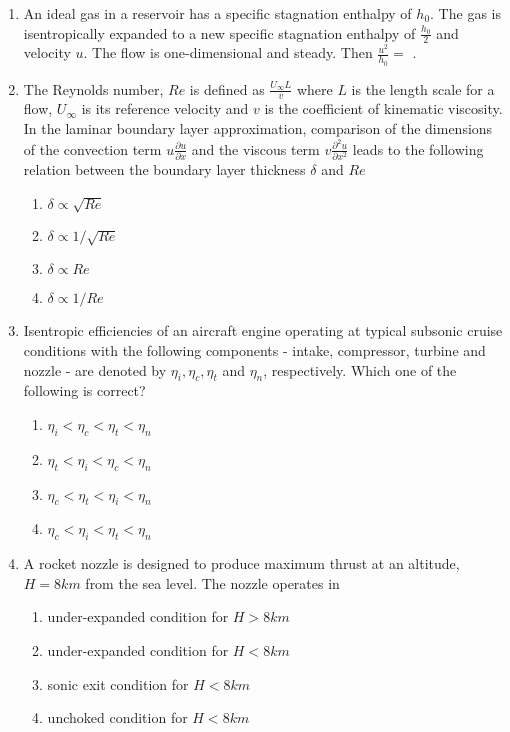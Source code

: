 \documentclass[journal,12pt,onecolumn]{IEEEtran}
\theoremstyle{remark}
\begin{document}
\begin{enumerate}
\item An ideal gas in a reservoir has a specific stagnation enthalpy of $h_0$. The gas is isentropically expanded to a new specific stagnation enthalpy of $\frac{h_{0}}{2}$ and velocity $u$. The flow is one-dimensional and steady. Then $\frac{u^2}{h_{0}}=$ \underline{\hspace{2cm}}.

\item The Reynolds number, $Re$ is defined as $\frac{U_{\infty}L}{v}$ where $L$ is the length scale for a flow, $U_{\infty}$ is its reference velocity and $v$ is the coefficient of kinematic viscosity. In the laminar boundary layer approximation, comparison of the dimensions of the convection term $u\frac{\partial u}{\partial x}$ and the viscous term $v\frac{\partial^{2}u}{\partial x^{2}}$ leads to the following relation between the boundary layer thickness $\delta$ and $Re$

\begin{enumerate}
	\item $\delta \propto \sqrt{Re}$
	\item $\delta \propto 1/\sqrt{Re}$
	\item $\delta \propto Re$
	\item $\delta \propto 1/Re$
\end{enumerate}

\item Isentropic efficiencies of an aircraft engine operating at typical subsonic cruise conditions with the following components - intake, compressor, turbine and nozzle - are denoted by $\eta _i, \eta _c, \eta _t$ and $\eta _n$, respectively. Which one of the following is correct?

\begin{enumerate}
	\item $\eta _i < \eta _c < \eta _t < \eta _n$
	\item $\eta _t < \eta _i < \eta _c < \eta _n$
	\item $\eta _c < \eta _t < \eta _i < \eta _n$
	\item $\eta _c < \eta _i < \eta _t < \eta _n$
\end{enumerate}

\item A rocket nozzle is designed to produce maximum thrust at an altitude, $H = 8km$ from the sea level. The nozzle operates in

\begin{enumerate}
	\item under-expanded condition for $H>8km$
	\item under-expanded condition for $H<8km$
	\item sonic exit condition for $H<8km$
	\item unchoked condition for $H<8km$
\end{enumerate}


\end{enumerate}
\end{document}
